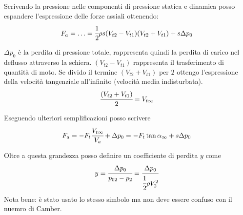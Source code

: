 Scrivendo la pressione nelle componenti di pressione statica e dinamica posso espandere l'espressione delle forze assiali ottenendo:
\begin{equation}
F_a =\ldots=\cfrac{1}{2} \rho s (V_{t2}-V_{t1}) (V_{t2}+V_{t1}) + s \Delta p_0
\end{equation}

$\Delta p_0$ è la perdita di pressione totale, rappresenta quindi la perdita di carico nel deflusso attraverso la schiera. $(V_{t2}-V_{t1})$ rappresenta il trasferimento di quantità di moto. Se divido il termine $(V_{t2}+V_{t1})$ per $2$ ottengo l'espressione della velocità tangenziale all'infinito (velocità media indisturbata).
\begin{align*}
\cfrac{(V_{t2}+V_{t1})}{2} = V_{t \infty}
\end{align*}

Eseguendo ulteriori semplificazioni posso scrivere
\begin{equation}
F_a = -F_t \cfrac{V_{t \infty}}{V_a} + \Delta p_0 = - F_t \tan \alpha_{\infty} + s \Delta p_0
\end{equation}

Oltre a questa grandezza posso definire un coefficiente di perdita $y$ come
\begin{equation}
y = \cfrac{\Delta p_0}{p_{02}-p_2} = \cfrac{\Delta p_0}{\cfrac{1}{2} \rho V_2^2}
\end{equation}
Nota bene: è stato usato lo stesso simbolo ma non deve essere confuso con il nuemro di Camber.

